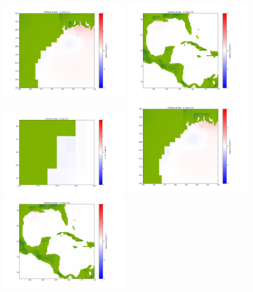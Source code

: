 \documentclass[11pt]{article}
\begin{document}
\includegraphics[width=0.475\textwidth]{frame0073fig1002.png}
\vskip 10pt 
\includegraphics[width=0.475\textwidth]{frame0073fig1003.png}
\vskip 10pt 
\includegraphics[width=0.475\textwidth]{frame0074fig1001.png}
\includegraphics[width=0.475\textwidth]{frame0074fig1002.png}
\vskip 10pt 
\includegraphics[width=0.475\textwidth]{frame0074fig1003.png}
\end{document}
